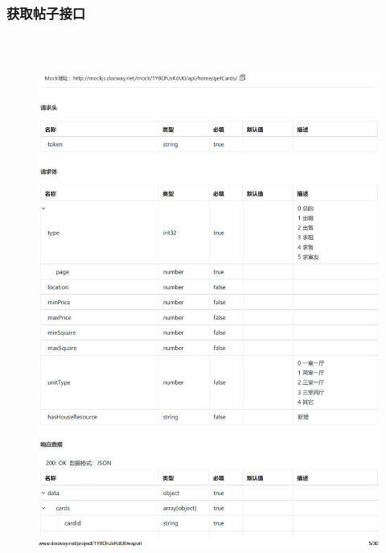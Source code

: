 \subsubsection{获取帖子接口}
\begin{figure}[h]
    \centering
    \includegraphics[height=18.0cm,width=14.0cm]{design/image/api4.png} 
    \end{figure}
    \newpage

